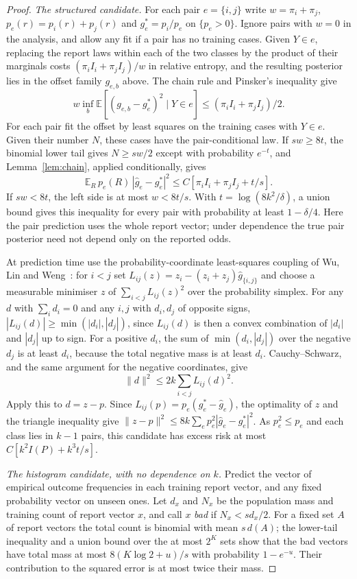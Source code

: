 \documentclass[11pt,a4paper]{article}
\theoremstyle{remark}
\newcommand{\E}{\mathbb E}
\begin{document}
\begin{proof}
\emph{The structured candidate.} For each pair $e=\{i,j\}$ write $w=\pi_i+\pi_j$, $p_e(r)=p_i(r)+p_j(r)$ and $g_e^*=p_i/p_e$ on $\{p_e>0\}$. Ignore pairs with $w=0$ in the analysis, and allow any fit if a pair has no training cases. Given $Y\in e$, replacing the report laws within each of the two classes by the product of their marginals costs $(\pi_i I_i+\pi_j I_j)/w$ in relative entropy, and the resulting posterior lies in the offset family $g_{e,b}$ above. The chain rule and Pinsker's inequality give
\[
 w\inf_b \E[(g_{e,b}-g_e^*)^2\mid Y\in e]\le (\pi_i I_i+\pi_j I_j)/2 .
\]
For each pair fit the offset by least squares on the training cases with $Y\in e$. Given their number $N$, these cases have the pair-conditional law. If $sw\ge8t$, the binomial lower tail gives $N\ge sw/2$ except with probability $e^{-t}$, and Lemma~\ref{lem:chain}, applied conditionally, gives
\[
 \E_R\, p_e(R)\,|\widehat g_e-g_e^*|^2
 \le C[\pi_iI_i+\pi_jI_j+t/s].
\]
If $sw<8t$, the left side is at most $w<8t/s$. With $t=\log(8k^2/\delta)$, a union bound gives this inequality for every pair with probability at least $1-\delta/4$. Here the pair prediction uses the whole report vector; under dependence the true pair posterior need not depend only on the reported odds.

At prediction time use the probability-coordinate least-squares coupling of Wu, Lin and Weng~\cite{wulw}: for $i<j$ set $L_{ij}(z)=z_i-(z_i+z_j)\widehat g_{\{i,j\}}$ and choose a measurable minimiser $z$ of $\sum_{i<j}L_{ij}(z)^2$ over the probability simplex. For any $d$ with $\sum_i d_i=0$ and any $i,j$ with $d_i,d_j$ of opposite signs, $|L_{ij}(d)|\ge\min(|d_i|,|d_j|)$, since $L_{ij}(d)$ is then a convex combination of $|d_i|$ and $|d_j|$ up to sign. For a positive $d_i$, the sum of $\min(d_i,|d_j|)$ over the negative $d_j$ is at least $d_i$, because the total negative mass is at least $d_i$. Cauchy--Schwarz, and the same argument for the negative coordinates, give
\[
 \|d\|^2\le 2k\sum_{i<j}L_{ij}(d)^2 .
\]
Apply this to $d=z-p$. Since $L_{ij}(p)=p_e(g_e^*-\widehat g_e)$, the optimality of $z$ and the triangle inequality give $\|z-p\|^2\le8k\sum_e p_e^2|\widehat g_e-g_e^*|^2$. As $p_e^2\le p_e$ and each class lies in $k-1$ pairs, this candidate has excess risk at most $C[k^2 I(P)+k^3t/s]$.

\emph{The histogram candidate, with no dependence on $k$.} Predict the vector of empirical outcome frequencies in each training report vector, and any fixed probability vector on unseen ones. Let $d_x$ and $N_x$ be the population mass and training count of report vector $x$, and call $x$ \emph{bad} if $N_x<sd_x/2$. For a fixed set $A$ of report vectors the total count is binomial with mean $s\,d(A)$; the lower-tail inequality and a union bound over the at most $2^K$ sets show that the bad vectors have total mass at most $8(K\log2+u)/s$ with probability $1-e^{-u}$. Their contribution to the squared error is at most twice their mass.


\end{proof}
\end{document}
